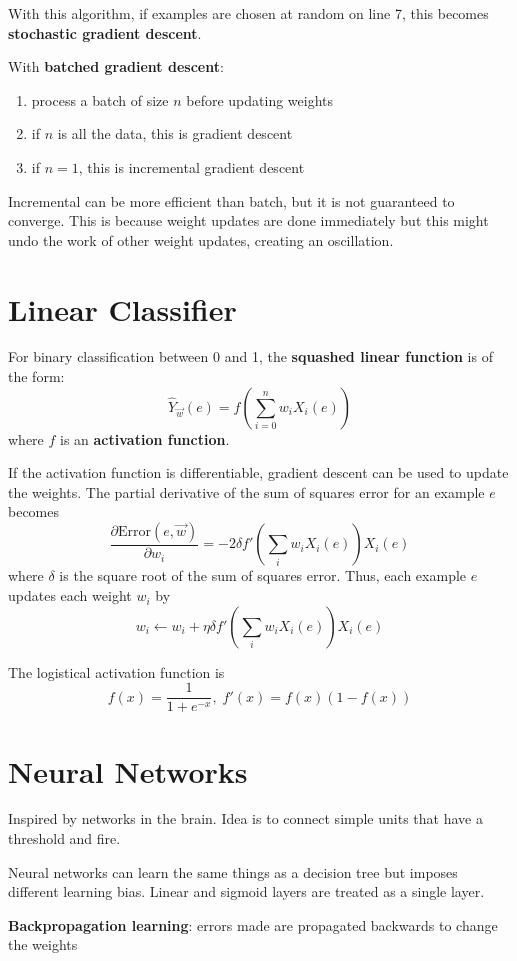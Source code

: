 \documentclass[11pt]{article}
\begin{document}
With this algorithm, if examples are chosen at random on line 7, this becomes
\textbf{stochastic gradient descent}.

With \textbf{batched gradient descent}:
\begin{enumerate}
\item process a batch of size \(n\) before updating weights
\item if \(n\) is all the data, this is gradient descent
\item if \(n=1\), this is incremental gradient descent
\end{enumerate}

Incremental can be more efficient than batch, but it is not guaranteed to
converge.
This is because weight updates are done immediately but this might undo the
work of other weight updates, creating an oscillation.
\section{Linear Classifier}
\label{sec:orgff51065}
For binary classification between 0 and 1, the \textbf{squashed linear function} is of the form:
$$ \hat{Y}_{\vec{w}}(e) = f \left( \sum_{i=0}^{n} w_{i}X_{i}(e) \right) $$
where \(f\) is an \textbf{activation function}.

If the activation function is differentiable, gradient descent can be used to update
the weights.
The partial derivative of the sum of squares error for an example \(e\) becomes
$$ \frac{\partial \text{Error}(e, \vec{w})}{\partial w_{i}} = -2 \delta f' \left( \sum_{i} w_{i} X_{i}(e) \right) X_{i}(e) $$
where \(\delta\) is the square root of the sum of squares error.
Thus, each example \(e\) updates each weight \(w_{i}\) by
$$ w_{i} \gets w_{i} + \eta \delta f' \left( \sum_{i} w_{i}X_{i}(e) \right) X_{i}(e) $$

The logistical activation function is
$$ f(x) = \frac{1}{1 + e^{-x}}, \; f'(x) = f(x)(1 - f(x)) $$
\section{Neural Networks}
\label{sec:org5ef0b17}
Inspired by networks in the brain.
Idea is to connect simple units that have a threshold and fire.

Neural networks can learn the same things as a decision tree but imposes
different learning bias.
Linear and sigmoid layers are treated as a single layer.

\textbf{Backpropagation learning}: errors made are propagated backwards to change the weights
\end{document}
